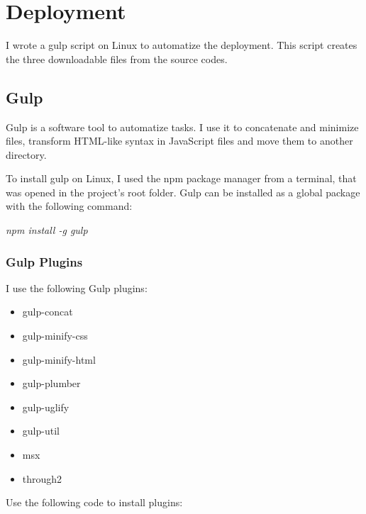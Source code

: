 \chapter{Deployment}


I wrote a gulp script on Linux to automatize the deployment. This script creates the three downloadable files from the source codes.

\section{Gulp}
\label{gulp}

Gulp is a software tool to automatize tasks. I use it to concatenate and minimize files, transform HTML-like syntax in JavaScript files and move them to another directory.

To install gulp on Linux, I used the npm package manager from a terminal, that was opened in the project's root folder. Gulp can be installed as a global package with the following command:


\emph{npm install -g gulp}

\subsection{Gulp Plugins}

I use the following Gulp plugins:

\begin{itemize}
	\item gulp-concat
	\item gulp-minify-css
	\item gulp-minify-html
	\item gulp-plumber		
	\item gulp-uglify
	\item gulp-util
	\item msx
	\item through2
\end{itemize}
	
Use the following code to install plugins:

